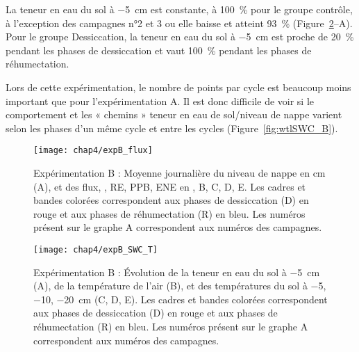 La teneur en eau du sol à \SI{-5}{\centi\metre} est constante, à \SI{100}{\percent} pour le groupe contrôle, à l'exception des campagnes n°2 et 3 ou elle baisse et atteint \SI{93}{\percent} (Figure~\ref{fig:HMty_T}--A).
Pour le groupe Dessiccation, la teneur en eau du sol à \SI{-5}{\centi\metre} est proche de \SI{20}{\percent} pendant les phases de dessiccation et vaut \SI{100}{\percent} pendant les phases de réhumectation.

Lors de cette expérimentation, le nombre de points par cycle est beaucoup moins important que pour l'expérimentation A.
Il est donc difficile de voir si le comportement et les « chemins » teneur en eau de sol/niveau de nappe varient selon les phases d'un même cycle et entre les cycles (Figure~\ref{fig:wtlSWC_B}).



\begin{figure}
\centering
\texttt{[image: chap4/expB\_flux]}
\caption{Expérimentation B : Moyenne journalière du niveau de nappe en cm (A), et des flux, \chh, RE, PPB, ENE en \si{\uml}, B, C, D, E. Les cadres et bandes colorées correspondent aux phases de dessiccation (D) en rouge et aux phases de réhumectation (R) en bleu. Les numéros présent sur le graphe A correspondent aux numéros des campagnes.}
\label{fig:HMty}
\end{figure}

\begin{figure}
\centering
\texttt{[image: chap4/expB\_SWC\_T]}
\caption{Expérimentation B : Évolution de la teneur en eau du sol à \SI{-5}{\centi\metre} (A), de la température de l'air (B), et des températures du sol à \num{-5}, \num{-10}, \SI{-20}{\centi\metre} (C, D, E). Les cadres et bandes colorées correspondent aux phases de dessiccation (D) en rouge et aux phases de réhumectation (R) en bleu. Les numéros présent sur le graphe A correspondent aux numéros des campagnes.}
\label{fig:HMty_T}
\end{figure}


